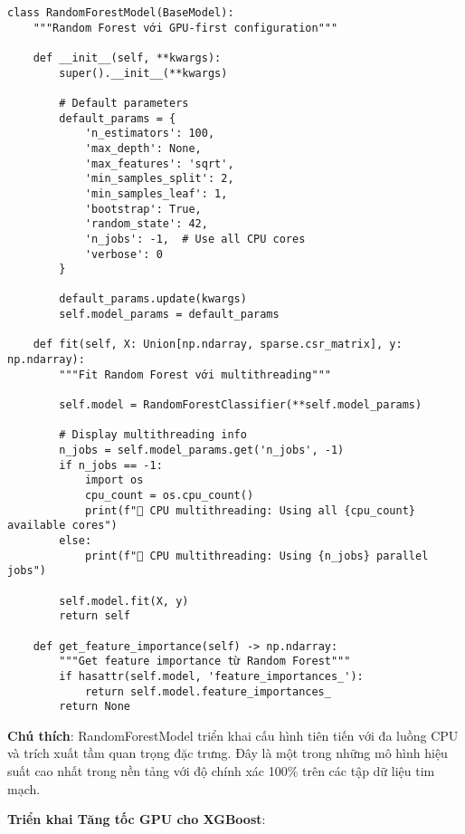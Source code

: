 \begin{verbatim}
class RandomForestModel(BaseModel):
    """Random Forest với GPU-first configuration"""
    
    def __init__(self, **kwargs):
        super().__init__(**kwargs)
        
        # Default parameters
        default_params = {
            'n_estimators': 100,
            'max_depth': None,
            'max_features': 'sqrt',
            'min_samples_split': 2,
            'min_samples_leaf': 1,
            'bootstrap': True,
            'random_state': 42,
            'n_jobs': -1,  # Use all CPU cores
            'verbose': 0
        }
        
        default_params.update(kwargs)
        self.model_params = default_params
        
    def fit(self, X: Union[np.ndarray, sparse.csr_matrix], y: np.ndarray):
        """Fit Random Forest với multithreading"""
        
        self.model = RandomForestClassifier(**self.model_params)
        
        # Display multithreading info
        n_jobs = self.model_params.get('n_jobs', -1)
        if n_jobs == -1:
            import os
            cpu_count = os.cpu_count()
            print(f"🔄 CPU multithreading: Using all {cpu_count} available cores")
        else:
            print(f"🔄 CPU multithreading: Using {n_jobs} parallel jobs")
            
        self.model.fit(X, y)
        return self
        
    def get_feature_importance(self) -> np.ndarray:
        """Get feature importance từ Random Forest"""
        if hasattr(self.model, 'feature_importances_'):
            return self.model.feature_importances_
        return None
\end{verbatim}

\textbf{Chú thích}: RandomForestModel triển khai cấu hình tiên tiến với đa luồng CPU và trích xuất tầm quan trọng đặc trưng. Đây là một trong những mô hình hiệu suất cao nhất trong nền tảng với độ chính xác 100\% trên các tập dữ liệu tim mạch.

\textbf{Triển khai Tăng tốc GPU cho XGBoost}:

